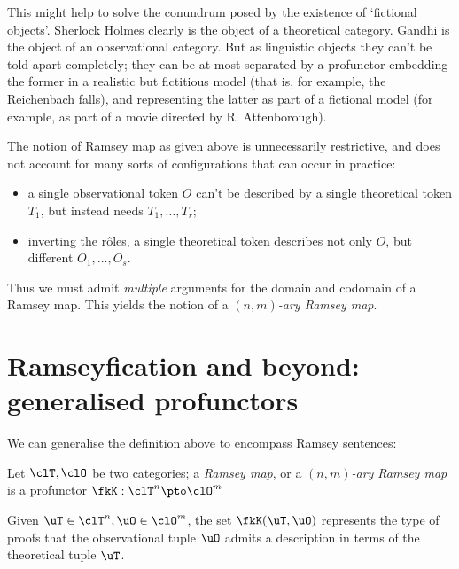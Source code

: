 \documentclass[a4paper]{../birkjour}
\begin{document}
This might help to solve the conundrum posed by the existence of `fictional objects'. Sherlock Holmes clearly is the object of a theoretical category. Gandhi is the object of an observational category. But as linguistic objects they can't be told apart completely; they can be at most separated by a profunctor embedding the former in a realistic but fictitious model (that is, for example, the Reichenbach falls), and representing the latter as part of a fictional model (for example, as part of a movie directed by R. Attenborough).

The notion of Ramsey map as given above is unnecessarily restrictive, and does not account for many sorts of configurations that can occur in practice:
\begin{itemize}
  \item a single observational token $O$ can't be described by a single theoretical token $T_1$, but instead needs $T_1,\dots,T_r$;
  \item inverting the r\^oles, a single theoretical token describes not only $O$, but different $O_1,\dots,O_s$.
\end{itemize}
Thus we must admit \emph{multiple} arguments for the domain and codomain of a Ramsey map. This yields the notion of a \emph{$(n,m)$-ary Ramsey map}.
\section{Ramseyfication and beyond: generalised profunctors}
\label{sec:org50db6c2}
We can generalise the definition above to encompass Ramsey sentences:
\begin{definition}
  Let $\clT,\clO$ be two categories; a \emph{Ramsey map}, or a \emph{$(n,m)$-ary Ramsey map} is a profunctor $\fkK : \clT^n \pto \clO^m$
\end{definition}
Given $\uT\in\clT^n, \uO\in\clO^m$, the set $\fkK(\uT, \uO)$ represents the type of proofs that the observational tuple $\uO$ admits a description in terms of the theoretical tuple $\uT$.
\end{document}
